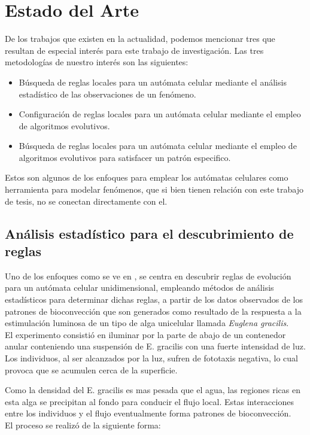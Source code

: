 \chapter{Estado del Arte}

De los trabajos que existen en la actualidad, podemos mencionar tres que resultan de especial interés para este trabajo de investigación. Las tres metodologías de nuestro interés son las siguientes:
\begin{itemize}
	\item Búsqueda de reglas locales para un autómata celular mediante el análisis estadístico de las observaciones de un fenómeno.
	\item Configuración de reglas locales para un autómata celular mediante el empleo de algoritmos evolutivos.
	\item Búsqueda de reglas locales para un autómata celular mediante el empleo de algoritmos evolutivos para satisfacer un patrón especifico.
\end{itemize}

Estos son algunos de los enfoques para emplear los autómatas celulares como herramienta para modelar fenómenos, que si bien tienen relación con este trabajo de tesis, no se conectan directamente con el.

\section{Análisis estadístico para el descubrimiento de reglas }

Uno de los enfoques como se ve en \citep{kawaharada2016cellular}, se centra en descubrir reglas de evolución para un autómata celular unidimensional, empleando métodos de análisis estadísticos para determinar dichas reglas, a partir de los datos observados de los patrones de bioconvección que son generados como resultado de la respuesta a la estimulación luminosa de un tipo de alga unicelular llamada \emph{Euglena gracilis}.
\\
El experimento consistió en iluminar por la parte de abajo de un contenedor anular conteniendo una suspensión de E. gracilis con una fuerte intensidad de luz. Los individuos, al ser alcanzados por la luz, sufren de fototaxis negativa, lo cual provoca que se acumulen cerca de la superficie.

Como la densidad del E. gracilis es mas pesada que el agua, las regiones ricas en esta alga se precipitan al fondo para conducir el flujo local. Estas interacciones entre los individuos y el flujo eventualmente forma patrones de bioconvección.
\\
El proceso se realizó de la siguiente forma:

